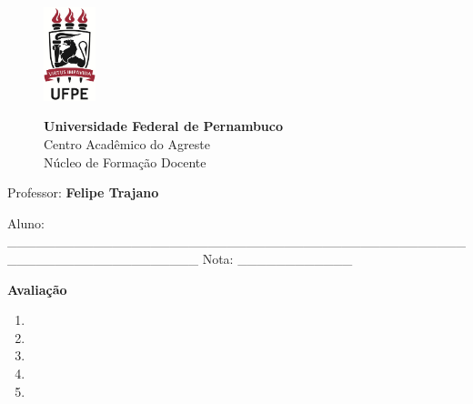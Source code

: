 \documentclass[12pt]{report}
\begin{document}
\thispagestyle{empty}

\begin{figure}[ht]
\hspace{0.5cm}
\begin{minipage}[b]{0.11\linewidth}
\centering
\includegraphics[width=1.5cm]{logoufpe.jpg}
\end{minipage}
\hspace{0.5cm}
\begin{minipage}[b]{0.75\linewidth}
\centering
\large\textbf{Universidade Federal de Pernambuco}\\
Centro Acad\^emico do Agreste	\\
N\'ucleo de Forma\c{c}\~ao Docente\\
\end{minipage}
\end{figure}
Professor: \textbf{Felipe Trajano}
\vspace{0.2cm}

Aluno: \_\_\_\_\_\_\_\_\_\_\_\_\_\_\_\_\_\_\_\_\_\_\_\_\_\_\_\_\_\_\_\_\_\_\_\_\_\_\_\_\_\_\_\_\_\_\_\_\_\_\_\_\_\_\_\_\_\_\_\_\_\_\_\_\_\_\_\_ Nota: \_\_\_\_\_\_\_\_\_\_\_\_
\vspace{0.2cm}
\begin{center}
\textbf{Avalia\c{c}\~ao}
\end{center}


\vspace{0.2cm}
\normalsize

\begin{enumerate}

\item 


\newpage
\item 


\newpage
\item 


\newpage
\item     


\newpage
\item 


\end{enumerate}
\end{document}
